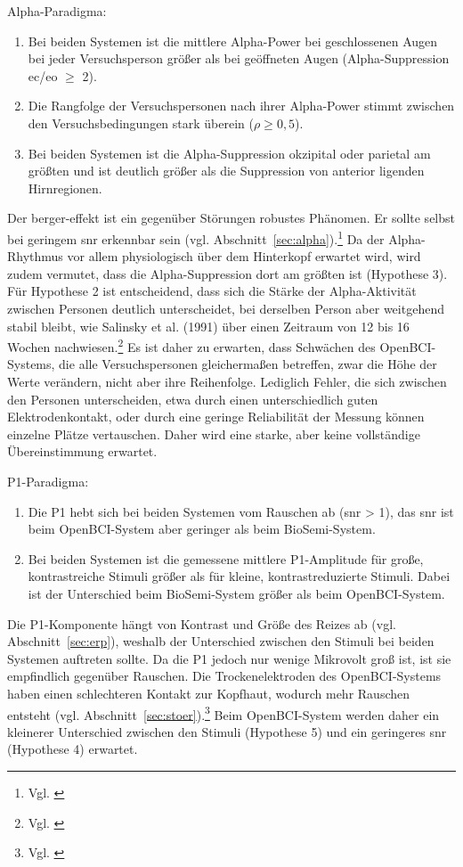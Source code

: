 Alpha-Paradigma:
\begin{enumerate}[label=Hypothese \arabic*:, leftmargin=*, align=left]
    \item Bei beiden Systemen ist die mittlere Alpha-Power bei geschlossenen Augen bei jeder Versuchsperson größer als bei geöffneten Augen (Alpha-Suppression \acrshort{ec}/\acrshort{eo} $\geq$ 2).
    \item Die Rangfolge der Versuchspersonen nach ihrer Alpha-Power stimmt zwischen den Versuchsbedingungen stark überein ($\rho \geq 0{,}5$).
    \item Bei beiden Systemen ist die Alpha-Suppression okzipital oder parietal am größten und ist deutlich größer als die Suppression von anterior ligenden Hirnregionen.
    \end{enumerate}
Der \gls{berger-effekt} ist ein gegenüber Störungen robustes Phänomen. Er sollte selbst bei geringem \acrshort{snr} erkennbar sein (vgl. Abschnitt~\ref{sec:alpha}).\footnote{Vgl. \cite[S.~3]{kleeva2024_dryeeg}} Da der Alpha-Rhythmus vor allem physiologisch über dem Hinterkopf erwartet wird, wird zudem vermutet, dass die Alpha-Suppression dort am größten ist (Hypothese 3). Für Hypothese 2 ist entscheidend, dass sich die Stärke der Alpha-Aktivität zwischen Personen deutlich unterscheidet, bei derselben Person aber weitgehend stabil bleibt, wie Salinsky et al. (1991) über einen Zeitraum von 12 bis 16 Wochen nachwiesen.\footnote{Vgl. \cite[S.~382]{salinsky1991}} Es ist daher zu erwarten, dass Schwächen des OpenBCI-Systems, die alle Versuchspersonen gleichermaßen betreffen, zwar die Höhe der Werte verändern, nicht aber ihre Reihenfolge. Lediglich Fehler, die sich zwischen den Personen unterscheiden, etwa durch einen unterschiedlich guten Elektrodenkontakt, oder durch eine geringe Reliabilität der Messung können einzelne Plätze vertauschen. Daher wird eine starke, aber keine vollständige Übereinstimmung erwartet.

P1-Paradigma:
\begin{enumerate}[label=Hypothese \arabic*:, leftmargin=*, align=left, resume]
    \item Die P1 hebt sich bei beiden Systemen vom Rauschen ab (\acrshort{snr} > 1), das \acrshort{snr} ist beim OpenBCI-System aber geringer als beim BioSemi-System.
    \item Bei beiden Systemen ist die gemessene mittlere P1-Amplitude für große, kontrastreiche Stimuli größer als für kleine, kontrastreduzierte Stimuli. Dabei ist der Unterschied beim BioSemi-System größer als beim OpenBCI-System.
    \end{enumerate}
Die P1-Komponente hängt von Kontrast und Größe des Reizes ab (vgl. Abschnitt~\ref{sec:erp}), weshalb der Unterschied zwischen den Stimuli bei beiden Systemen auftreten sollte. Da die P1 jedoch nur wenige Mikrovolt groß ist, ist sie empfindlich gegenüber Rauschen. Die Trockenelektroden des OpenBCI-Systems haben einen schlechteren Kontakt zur Kopfhaut, wodurch mehr Rauschen entsteht (vgl. Abschnitt~\ref{sec:stoer}).\footnote{Vgl. \cite[S.~900]{kappenman2010}} Beim OpenBCI-System werden daher ein kleinerer Unterschied zwischen den Stimuli (Hypothese 5) und ein geringeres \acrshort{snr} (Hypothese 4) erwartet.


